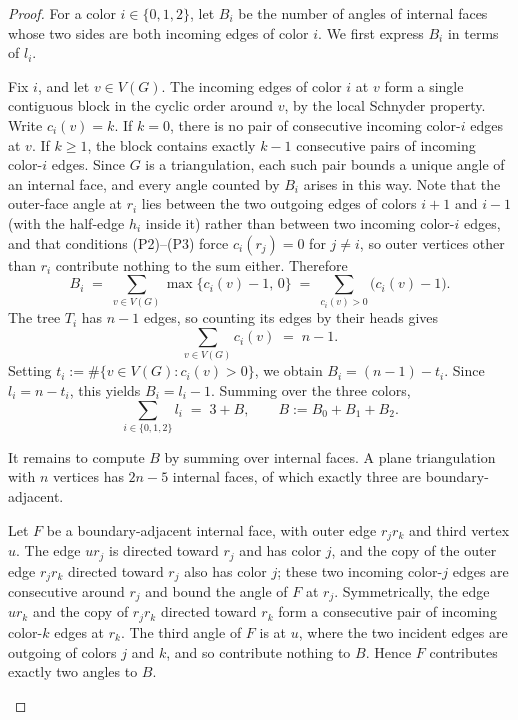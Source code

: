 \documentclass[11pt]{amsart}
\newcommand{\Zthree}{\{0,1,2\}}
\theoremstyle{plain}
\theoremstyle{definition}
\theoremstyle{remark}
\begin{document}
\begin{proof}
For a color $i \in \Zthree$, let $B_i$ be the number of angles of internal faces whose two sides are both incoming edges of color $i$. We first express $B_i$ in terms of $l_i$.

Fix $i$, and let $v \in V(G)$. The incoming edges of color $i$ at $v$ form a single contiguous block in the cyclic order around $v$, by the local Schnyder property. Write $c_i(v) = k$. If $k = 0$, there is no pair of consecutive incoming color-$i$ edges at $v$. If $k \ge 1$, the block contains exactly $k-1$ consecutive pairs of incoming color-$i$ edges. Since $G$ is a triangulation, each such pair bounds a unique angle of an internal face, and every angle counted by $B_i$ arises in this way. Note that the outer-face angle at $r_i$ lies between the two outgoing edges of colors $i+1$ and $i-1$ (with the half-edge $h_i$ inside it) rather than between two incoming color-$i$ edges, and that conditions (P2)--(P3) force $c_i(r_j) = 0$ for $j \neq i$, so outer vertices other than $r_i$ contribute nothing to the sum either. Therefore
\[
  B_i
  \;=\;
  \sum_{v \in V(G)} \max\{c_i(v) - 1,\, 0\}
  \;=\;
  \sum_{c_i(v) > 0} \bigl(c_i(v) - 1\bigr).
\]
The tree $T_i$ has $n - 1$ edges, so counting its edges by their heads gives
\[
  \sum_{v \in V(G)} c_i(v) \;=\; n - 1.
\]
Setting $t_i := \#\{v \in V(G) : c_i(v) > 0\}$, we obtain $B_i = (n - 1) - t_i$. Since $l_i = n - t_i$, this yields $B_i = l_i - 1$. Summing over the three colors,
\[
  \sum_{i \in \Zthree} l_i \;=\; 3 + B,
  \qquad B := B_0 + B_1 + B_2.
\]

It remains to compute $B$ by summing over internal faces. A plane triangulation with $n$ vertices has $2n - 5$ internal faces, of which exactly three are boundary-adjacent.

Let $F$ be a boundary-adjacent internal face, with outer edge $r_j r_k$ and third vertex $u$. The edge $u r_j$ is directed toward $r_j$ and has color $j$, and the copy of the outer edge $r_j r_k$ directed toward $r_j$ also has color $j$; these two incoming color-$j$ edges are consecutive around $r_j$ and bound the angle of $F$ at $r_j$. Symmetrically, the edge $u r_k$ and the copy of $r_j r_k$ directed toward $r_k$ form a consecutive pair of incoming color-$k$ edges at $r_k$. The third angle of $F$ is at $u$, where the two incident edges are outgoing of colors $j$ and $k$, and so contribute nothing to $B$. Hence $F$ contributes exactly two angles to $B$.

\begin{figure}[H]
\centering
{}
\end{figure}
\end{proof}
\end{document}
